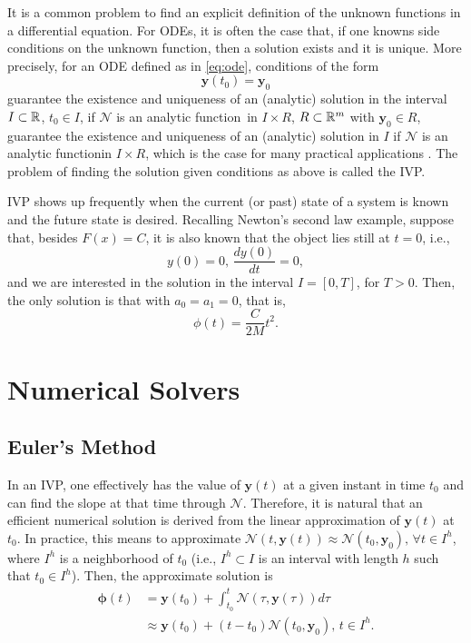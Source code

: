 It is a common problem to find an explicit definition of the unknown functions in a differential equation.
For \gls{ODE}s, it is often the case that, if one knowns side conditions on the unknown function, then a solution exists and it is unique.
More precisely, for an \gls{ODE} defined as in \eqref{eq:ode}, conditions of the form \[
   \bm{y}\left( t_0 \right) =\bm{y}_0
\] guarantee the existence and uniqueness of an (analytic) solution in the interval $I\subset \mathbb{R}$, $t_0\in I$, if $\mathcal{N}$ is an analytic function\footnotemark\, in $I\times R$, $R\subset \mathbb{R}^m$ with $\bm{y}_0\in R$, guarantee the existence and uniqueness of an (analytic) solution in $I$ if $\mathcal{N}$ is an analytic function\footnotemark in $I\times R$, which is the case for many practical applications \cite{iserles_first_2008}.
The problem of finding the solution given conditions as above is called the \gls{IVP}.

\gls{IVP} shows up frequently when the current (or past) state of a system is known and the future state is desired.
Recalling Newton's second law example, suppose that, besides $F(x)=C$, it is also known that the object lies still at $t=0$, i.e., \[
y(0) = 0,\,\frac{d y(0)}{dt}=0
,\] and we are interested in the solution in the interval $I=\left[ 0,T \right] $, for $T>0$. Then, the only solution is that with $a_0=a_1=0$, that is, \[
    \phi\left( t \right) = \frac{C}{2M}t^2
.\] 

\section{Numerical Solvers}

\subsection{Euler's Method}

In an \gls{IVP}, one effectively has the value of $\bm{y}\left( t \right) $ at a given instant in time $t_0$ and can find the slope at that time through $\mathcal{N}$.
Therefore, it is natural that an efficient numerical solution is derived from the linear approximation of $\bm{y}\left( t \right) $ at $t_0$.
In practice, this means to approximate $\mathcal{N}\left( t, \bm{y}\left( t \right) \right) \approx \mathcal{N}\left( t_0, \bm{y}_0 \right),\,\forall t\in I^h $, where $I^h$ is a neighborhood of $t_0$ (i.e., $I^h \subset I$ is an interval with length $h$ such that $t_0\in I^h$).
Then, the approximate solution is
\begin{align*}
    \bm{\phi}\left( t \right) &= \bm{y}\left( t_0 \right) + \int_{t_0}^{t}\mathcal{N}\left( \tau, \bm{y}\left( \tau \right) \right)d\tau \\
    &\approx \bm{y}\left( t_0 \right) + \left( t-t_0 \right)\mathcal{N}\left( t_0, \bm{y}_0 \right),\,t\in I^h
.\end{align*}

